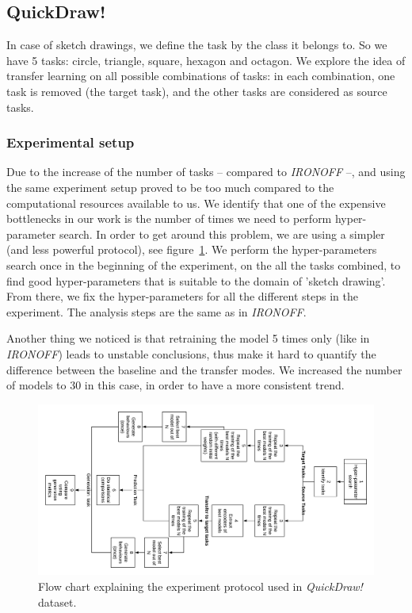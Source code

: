   \subsection{QuickDraw!}
    \par In case of sketch drawings, we define the task by the class it belongs to. So we have 5 tasks: circle, triangle, square, hexagon and octagon. We explore the idea of transfer learning on all possible combinations of tasks: in each combination, one task is removed (the target task), and the other tasks are considered as source tasks.

    \subsubsection{Experimental setup}
    \par Due to the increase of the number of tasks -- compared to \textit{IRONOFF} --, and using the same experiment setup proved to be too much compared to the computational resources available to us. We identify that one of the expensive bottlenecks in our work is the number of times we need to perform hyper-parameter search. In order to get around this problem, we are using a simpler (and less powerful protocol), see figure~\ref{fig:quickdraw_protocol}. We perform the hyper-parameters search once in the beginning of the experiment, on the all the tasks combined, to find good hyper-parameters that is suitable to the domain of 'sketch drawing'. From there, we fix the hyper-parameters for all the different steps in the experiment. The analysis steps are the same as in \textit{IRONOFF}.

    Another thing we noticed is that retraining the model 5 times only (like in \textit{IRONOFF}) leads to unstable conclusions, thus make it hard to quantify the difference between the baseline and the transfer modes. We increased the number of models to 30 in this case, in order to have a more consistent trend.

    \begin{figure}
      \includegraphics[scale=0.3]{images/sota/quickdraw_results/QuickDraw_transfer_learning_flow.png}
      \caption{Flow chart explaining the experiment protocol used in \textit{QuickDraw!} dataset.}
      \label{fig:quickdraw_protocol}
    \end{figure}

